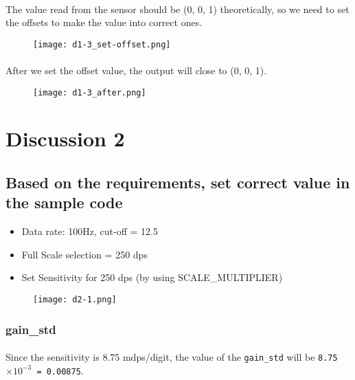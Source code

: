 \paragraph{}
The value read from the sensor should be (0, 0, 1) theoretically, so we need to set the offsets to make the value into correct ones.
\begin{figure}[!h]
    \begin{center} 
        \texttt{[image: d1-3\_set-offset.png]} 
    \end{center} 
\end{figure}
\newpage
\paragraph{}
After we set the offset value, the output will close to (0, 0, 1).
\begin{figure}[!h]
    \begin{center} 
        \texttt{[image: d1-3\_after.png]} 
    \end{center} 
\end{figure} 
\section{Discussion 2}
\subsection{Based on the requirements, set correct value in the sample code}
\begin{itemize}
    \item Data rate: 100Hz, cut-off = 12.5
    \item Full Scale selection = 250 dps
    \item Set Sensitivity for 250 dps (by using SCALE\_MULTIPLIER)
\end{itemize}
\begin{figure}[!h]
    \begin{center} 
        \texttt{[image: d2-1.png]} 
    \end{center} 
\end{figure} 
\subsubsection{gain\_std}
\paragraph{}
Since the sensitivity is 8.75 mdps/digit, the value of the \texttt{gain\_std} will be \texttt{8.75$\times 10^{-3}$ = 0.00875}.
\newpage
